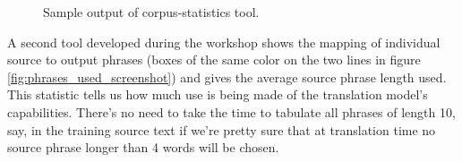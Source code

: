 \documentclass[10pt]{report}
\theoremstyle{plain}
\begin{document}
{\begin{figure}[h]
\centering
\caption{Sample output of corpus-statistics tool.}
\label{fig:sentence_by_sentence_screenshot}
 \newline
{}
\end{figure}

A second tool developed during the workshop shows the mapping of individual source to output phrases (boxes of the same color on the two lines in figure \ref{fig:phrases_used_screenshot}) and gives the average source phrase length used. This statistic tells us how much use is being made of the translation model's capabilities. There's no need to take the time to tabulate all phrases of length 10, say, in the training source text if we're pretty sure that at translation time no source phrase longer than 4 words will be chosen.

}
\end{document}
